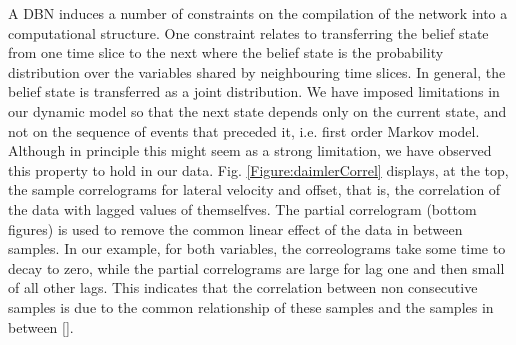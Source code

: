A DBN induces a number of constraints on the compilation of the network into a computational structure. One constraint relates to transferring the belief state from one time slice to the next where the belief state is the probability distribution over the variables shared by neighbouring time slices. In general, the belief state is transferred as a joint distribution. We have imposed limitations in our dynamic model so that the next state depends only on the current state, and not on the sequence of events that preceded it, i.e. first order Markov model. Although in principle this might seem as a strong limitation, we have observed this property to hold in our data. Fig. \ref{Figure:daimlerCorrel} displays, at the top, the sample correlograms for lateral velocity and offset, that is, the correlation of the data with lagged values of themselfves. The partial correlogram (bottom figures) is used to remove the common linear effect of the data in between samples. In our example, for both variables, the correolograms take some time to decay to zero, while the partial correlograms are large for lag one and then small of all other lags. This indicates that the correlation between non consecutive samples is due to the common relationship of these samples and the samples in between [].

